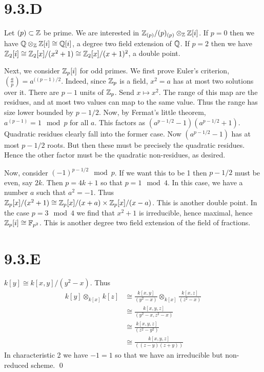 \documentclass{article}
\begin{document}
\section{9.3.D}
Let $(p) \subset \mathbb{Z}$ be prime. We are interested in
$\mathbb{Z}_{(p)}/(p)_{(p)}
    \otimes_{\mathbb{Z}} \mathbb{Z}[i]$. If $p=0$ then we have
$\mathbb{Q} \otimes_{\mathbb{Z}} \mathbb{Z}[i] \cong
    \mathbb{Q}[i]$, a degree two field extension of
$\mathbb{Q}$. If $p=2$ then we have
$\mathbb{Z}_2[i] \cong \mathbb{Z}_2[x]/(x^2+1) \cong
    \mathbb{Z}_2[x]/(x+1)^2$, a double point.

Next, we consider $\mathbb{Z}_p[i]$ for odd primes. We first prove
Euler's criterion, $(\frac{a}{p})=a^{((p-1)/2}$. Indeed, since
$\mathbb{Z}_p$ is a field, $x^2=a$ has at most two
solutions over it. There are $p-1$ units of
$\mathbb{Z}_p$. Send $x \mapsto x^2$. The range of this map
are the residues, and at most two values can map to the same value. Thus the
range has size lower bounded by $p-1/2$. Now, by Fermat's
little theorem, $a^(p-1)=1 \mod p$ for all $a$. This
factors as $(a^{p-1/2}-1)(a^{p-1/2}+1)$. Quadratic residues clearly fall into the
former case. Now $(a^{p-1/2}-1)$ has at most $p-1/2$
roots. But then these must be precisely the quadratic residues. Hence the other
factor must be the quadratic non-residues, as desired.

Now, consider $(-1)^{p-1/2} \mod p$. If we want this to be 1 then
$p-1/2$ must be even, say $2k$. Then
$p=4k+1$ so that $p = 1 \mod 4$. In this case, we have
a number $a$ such that $a^2=-1$. Thus
$\mathbb{Z}_p[x]/(x^2+1) \cong \mathbb{Z}_p[x]/(x+a) \times
    \mathbb{Z}_p[x]/(x-a)$. This is another double point. In the case
$p=3 \mod 4$ we find that $x^2+1$ is irreducible,
hence maximal, hence $\mathbb{Z}_p[i] \cong \mathbb{F}_{p^2}$. This is another degree two field
extension of the field of fractions.

\section{9.3.E}
$k[y] \cong k[x, y]/(y^2-x)$. Thus
\begin{align*}
    k[y] \otimes_{k[x]} k[z] & \cong \frac{k[x,y]}{(y^2-x)} \otimes_{k[x]} \frac{k[x,z]}{(z^2-x)} \\
                             & \cong \frac{k[x,y,z]}{(y^2-x, z^2-x)}                              \\
                             & \cong \frac{k[x,y,z]}{(z^2-y^2)}                                   \\
                             & \cong \frac{k[x,y,z]}{((z-y)(z+y))}
\end{align*}
In characteristic 2 we have $-1=1$ so that we have an
irreducible but non-reduced scheme. \qed
\end{document}
